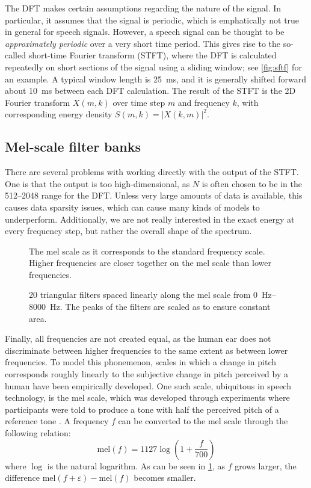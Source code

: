 The DFT makes certain assumptions regarding the nature of the signal.
In particular, it assumes that the signal is periodic, which is emphatically not true in general for speech signals.
However, a speech signal can be thought to be \emph{approximately periodic} over a very short time period.
This gives rise to the so-called short-time Fourier transform (STFT), where the DFT is calculated repeatedly on short sections of the signal using a sliding window; see \cref{fig:sftf} for an example.
A typical window length is \SI{25}{\ms}, and it is generally shifted forward about \SI{10}{\ms} between each DFT calculation.
The result of the STFT is the 2D Fourier transform $X(m,k)$ over time step $m$ and frequency $k$, with corresponding energy density $S(m,k) = \left|X(k,m)\right|^2$.

\subsection{Mel-scale filter banks}

There are several problems with working directly with the output of the STFT. One is that the output is too high-dimensional, as $N$ is often chosen to be in the \numrange{512}{2048} range for the DFT.
Unless very large amounts of data is available, this causes data sparsity issues, which can cause many kinds of models to underperform.
Additionally, we are not really interested in the exact energy at every frequency step, but 
rather the overall shape of the spectrum.

\begin{figure}
  \centering
  
  \caption{\label{fig:melscale}The mel scale as it corresponds to the standard frequency scale.
  Higher frequencies are closer together on the mel scale than lower frequencies.}
\end{figure}

\begin{figure}
  \centering
  
  \caption{\label{fig:filterbank}20 triangular filters spaced linearly along the mel scale from \SIrange{0}{8000}{\Hz}.
  The peaks of the filters are scaled as to ensure constant area.}
\end{figure}

Finally, all frequencies are not created equal, as the human ear does not discriminate between higher frequencies to the same extent as between lower frequencies.
To model this phonemenon, scales in which a change in pitch corresponds roughly linearly to the subjective change in pitch perceived by a human have been empirically developed.
One such scale, ubiquitous in speech technology, is the mel scale, which was developed through experiments where participants were told to produce a tone with half the perceived pitch of a reference tone \parencite{stevens1937scale}.
A frequency $f$ can be converted to the mel scale through the following relation:
\[
  \mathrm{mel}(f) = 1127\log\left(1 + \frac{f}{700}\right)
\]
where $\log$ is the natural logarithm.
As can be seen in \cref{fig:melscale}, as $f$ grows larger, the difference $\mathrm{mel}(f+\varepsilon) - \mathrm{mel}(f)$ becomes smaller.

